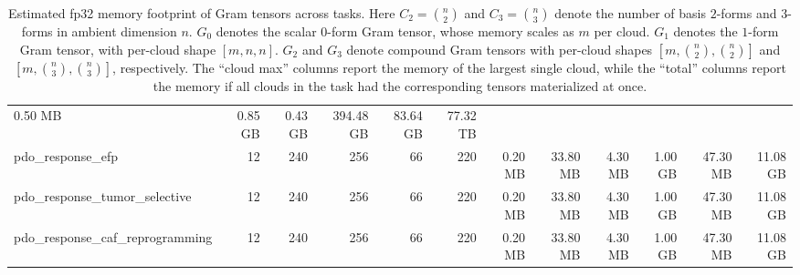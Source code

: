 \documentclass{article}
\let\todo\undefined
\let\todo\undefined
\newcommand{\todo}[1][]{}
\theoremstyle{remark}
\theoremstyle{plain}
\begin{document}
\begin{table}[t]
{\begin{tabular}{lrrrrrrrrrrr}
0.50 MB & 0.85 GB & 0.43 GB & 394.48 GB & 83.64 GB & 77.32 TB \\
pdo\_response\_efp & 12 & 240 & 256 & 66 & 220 &
0.20 MB & 33.80 MB & 4.30 MB & 1.00 GB & 47.30 MB & 11.08 GB \\
pdo\_response\_tumor\_selective & 12 & 240 & 256 & 66 & 220 &
0.20 MB & 33.80 MB & 4.30 MB & 1.00 GB & 47.30 MB & 11.08 GB \\
pdo\_response\_caf\_reprogramming & 12 & 240 & 256 & 66 & 220 &
0.20 MB & 33.80 MB & 4.30 MB & 1.00 GB & 47.30 MB & 11.08 GB \\
\bottomrule
\end{tabular}%
}
\caption{Estimated fp32 memory footprint of Gram tensors across tasks. Here $C_2=\binom{n}{2}$ and $C_3=\binom{n}{3}$ denote the number of basis $2$-forms and $3$-forms in ambient dimension $n$. $G_0$ denotes the scalar $0$-form Gram tensor, whose memory scales as $m$ per cloud. $G_1$ denotes the $1$-form Gram tensor, with per-cloud shape $[m,n,n]$. $G_2$ and $G_3$ denote compound Gram tensors with per-cloud shapes $[m,\binom{n}{2},\binom{n}{2}]$ and $[m,\binom{n}{3},\binom{n}{3}]$, respectively. The ``cloud max'' columns report the memory of the largest single cloud, while the ``total'' columns report the memory if all clouds in the task had the corresponding tensors materialized at once.}
\label{tab:compound-gram-memory}
\end{table}


% 

% 

% 




%
\end{document}
